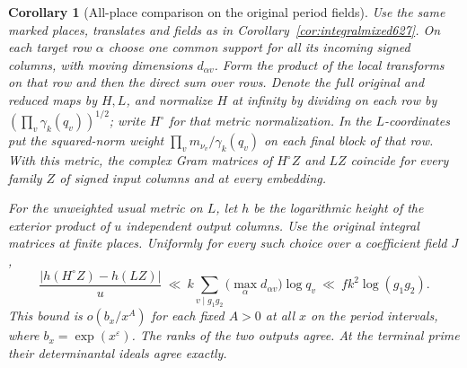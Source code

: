 \documentclass[a4paper,11pt]{article}
\newtheorem{corollary}[proposition]{Corollary}
\theoremstyle{definition}
\theoremstyle{remark}
\numberwithin{equation}{section}
\begin{document}
\begin{corollary}[All-place comparison on the original period fields]
\leavevmode\label{cor:globalreducedheight628}
Use the same marked places, translates and fields as in
Corollary~\ref{cor:integralmixed627}. On each target row \(\alpha\)
choose one common support for all its incoming signed columns, with
moving dimensions \(d_{\alpha v}\). Form the product of the local
transforms on that row and then the direct sum over rows. Denote
the full original and reduced maps by \(H,L\), and normalize \(H\)
at infinity by dividing on each row by
\((\prod_v\gamma_k(q_v))^{1/2}\); write \(H^\circ\) for that metric
normalization. In the \(L\)-coordinates put the squared-norm
weight \(\prod_v m_{\nu_v}/\gamma_k(q_v)\) on each final block
of that row. With this metric, the complex Gram matrices of
\(H^\circ Z\) and \(LZ\) coincide for every family \(Z\) of signed
input columns and at every embedding.

For the unweighted usual metric on \(L\), let \(h\) be the
logarithmic height of the exterior product of \(u\) independent
output columns. Use the original integral matrices at finite
places. Uniformly for every such choice over a coefficient
field \(J\),
\[
  \frac{|h(H^\circ Z)-h(LZ)|}{u}
     \ \ll\ k\sum_{v\mid g_1g_2}
                   \bigl(\max_\alpha d_{\alpha v}\bigr)\log q_v
     \ \ll\ f k^2\log(g_1g_2).
\]
This bound is \(o(b_x/x^A)\) for each fixed \(A>0\) at all \(x\)
on the period intervals, where \(b_x=\exp(x^\varepsilon)\).
The ranks of the two outputs agree. At the terminal prime their
determinantal ideals agree exactly.
\end{corollary}
\end{document}

